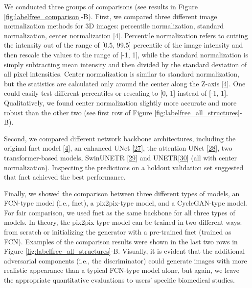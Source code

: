 We conducted three groups of comparisons (see results in Figure \ref{fig:labelfree_comparison}-B). First, we compared three different image normalization methods for 3D images: percentile normalization, standard normalization, center normalization {[}\protect\hyperlink{ref-Yq8wZ6hc}{4}{]}. Percentile normalization refers to cutting the intensity out of the range of {[}0.5, 99.5{]} percentile of the image intensity and then rescale the values to the range of {[}-1, 1{]}, while the standard normalization is simply subtracting mean intensity and then divided by the standard deviation of all pixel intensities. Center normalization is similar to standard normalization, but the statistics are calculated only around the center along the Z-axis {[}\protect\hyperlink{ref-Yq8wZ6hc}{4}{]}. One could easily test different percentiles or rescaling to {[}0, 1{]} instead of {[}-1, 1{]}. Qualitatively, we found center normalization slightly more accurate and more robust than the other two (see first row of Figure \ref{fig:labelfree_all_structures}-B).

Second, we compared different network backbone architectures, including the original fnet model {[}\protect\hyperlink{ref-Yq8wZ6hc}{4}{]}, an enhanced UNet {[}\protect\hyperlink{ref-M7480NLD}{27}{]}, the attention UNet {[}\protect\hyperlink{ref-OCow1hly}{28}{]}, two transformer-based models, SwinUNETR {[}\protect\hyperlink{ref-ZWL3IrVc}{29}{]} and UNETR{[}\protect\hyperlink{ref-XCKUntOB}{30}{]} (all with center normalization). Inspecting the predictions on a holdout validation set suggested that fnet achieved the best performance.

Finally, we showed the comparison between three different types of models, an FCN-type model (i.e., fnet), a pix2pix-type model, and a CycleGAN-type model. For fair comparison, we used fnet as the same backbone for all three types of models. In theory, the pix2pix-type model can be trained in two different ways: from scratch or initializing the generator with a pre-trained fnet (trained as FCN). Examples of the comparison results were shown in the last two rows in Figure \ref{fig:labelfree_all_structures}-B. Visually, it is evident that the additional adversarial components (i.e., the discriminator) could generate images with more realistic appearance than a typical FCN-type model alone, but again, we leave the appropriate quantitative evaluations to users' specific biomedical studies.

